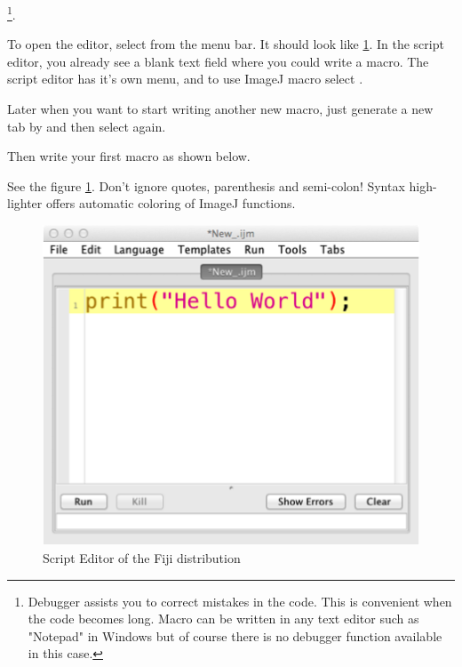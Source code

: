 \footnote{Debugger assists you to correct mistakes in the code. 
This is convenient when the code becomes long. 
Macro can be written in any text editor such as "Notepad" in Windows but of course 
there is no debugger function available in this case.}. 

To open the editor, select  from the menu bar. 
It should look like \ref{fig_ScriptEditor}. 
In the script editor, you already see a blank text field where you could write a macro. The script editor has it's own menu, and to use ImageJ macro select . 

Later when you want to start writing another new macro, just generate a new tab by  and then select  again.
 
Then write your first macro as shown below. 

\begin{quote}
\end{quote}

See the figure \ref{fig_ScriptEditor}. Don't ignore quotes, parenthesis and semi-colon!
Syntax high-lighter offers automatic coloring of ImageJ functions. 

\begin{figure}[hbtp]
\begin{center}
\includegraphics[scale=1.0]{fig/editor_helloworld_singleline.png}
\caption{Script Editor of the Fiji distribution} \label{fig_ScriptEditor}
\end{center}
\end{figure}


